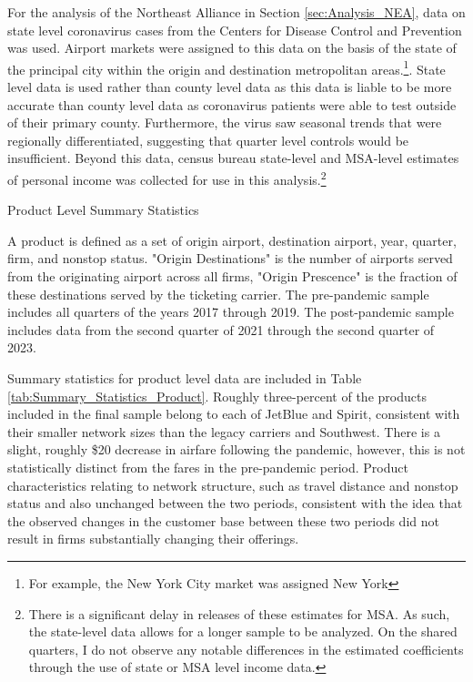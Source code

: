 \documentclass{article}
\begin{document}
	For the analysis of the Northeast Alliance in Section \ref{sec:Analysis_NEA}, data on state level coronavirus cases from the Centers for Disease Control and Prevention was used. Airport markets were assigned to this data on the basis of the state of the principal city within the origin and destination metropolitan areas.\footnote{For example, the New York City market was assigned New York}. State level data is used rather than county level data as this data is liable to be more accurate than county level data as coronavirus patients were able to test outside of their primary county. Furthermore, the virus saw seasonal trends that were regionally differentiated, suggesting that quarter level controls would be insufficient. Beyond this data, census bureau state-level and MSA-level estimates of personal income was collected for use in this analysis.\footnote{There is a significant delay in releases of these estimates for MSA. As such, the state-level data allows for a longer sample to be analyzed. On the shared quarters, I do not observe any notable differences in the estimated coefficients through the use of state or MSA level income data.}

    \begin{table}
    \caption{Product Level Summary Statistics}
    \label{tab:Summary_Statistics_Product}
    
    \footnotesize{A product is defined as a set of origin airport, destination airport, year, quarter, firm, and nonstop status. "Origin Destinations" is the number of airports served from the originating airport across all firms, "Origin Prescence" is the fraction of these destinations served by the ticketing carrier. The pre-pandemic sample includes all quarters of the years 2017 through 2019. The post-pandemic sample includes data from the second quarter of 2021 through the second quarter of 2023.}
    \end{table}

    Summary statistics for product level data are included in Table \ref{tab:Summary_Statistics_Product}. Roughly three-percent of the products included in the final sample belong to each of JetBlue and Spirit, consistent with their smaller network sizes than the legacy carriers and Southwest. There is a slight, roughly \$20 decrease in airfare following the pandemic, however, this is not statistically distinct from the fares in the pre-pandemic period. Product characteristics relating to network structure, such as travel distance and nonstop status and also unchanged between the two periods, consistent with the idea that the observed changes in the customer base between these two periods did not result in firms substantially changing their offerings.  
\end{document}

